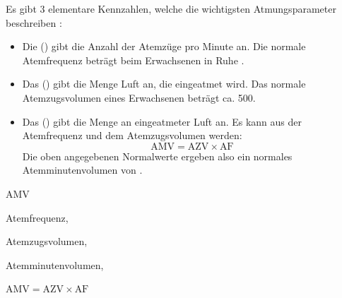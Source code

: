 {%
\label{topic:atemvolumina}
%
Es gibt 3 elementare Kennzahlen, welche die wichtigsten Atmungsparameter
beschreiben
\cite{KlinkePhysio3,SchmidtPhysio28,DRAn3,StriebelAn7}:

\begin{itemize}
  \item Die  () gibt die Anzahl der
  Atemzüge pro Minute an. Die normale Atemfrequenz  beträgt beim Erwachsenen
  in Ruhe \PerMin*.
  \item Das  () gibt die Menge
  Luft an, die  eingeatmet wird. Das normale
  Atemzugsvolumen  eines Erwachsenen beträgt ca.
  500\Ml*.
  \item Das  () gibt die Menge
  an  eingeatmeter Luft an. 
  Es kann aus der
  Atemfrequenz und dem Atemzugsvolumen  werden:
  {\FontSansNarrowFamily
  \begin{equation}
    \mbox{AMV} = \mbox{AZV} \times \mbox{AF}
  \end{equation}}
  Die oben angegebenen Normalwerte ergeben also ein normales
  Atemminutenvolumen von  \LPerMin*. 
\end{itemize}

}{
\begin{labeling}[:]{AMV}
    \item[AF] Atemfrequenz,
    \item[AZV] Atemzugsvolumen,
    \EE{500\Ml*}
    \item[AMV] Atemminutenvolumen,
\end{labeling}

\begin{center}
{\FontSansNarrowFamily
$\mbox{AMV} = \mbox{AZV} \times \mbox{AF}$
}
\end{center}
}{}{}{}


